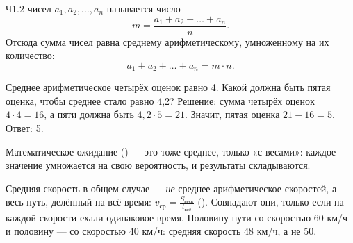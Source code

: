 
\begin{tema}{Ч1.2}
 чисел $a_1, a_2, \dots, a_n$ называется число
\[
  m=\frac{a_1+a_2+\dots+a_n}{n}.
\]
Отсюда сумма чисел равна среднему арифметическому, умноженному на их количество:
\[
  a_1+a_2+\dots+a_n=m\cdot n.
\]

\begin{primer}
Среднее арифметическое четырёх оценок равно 4. Какой должна быть пятая оценка,
чтобы среднее стало равно 4,2?
Решение: сумма четырёх оценок $4\cdot4=16$, а пяти должна быть $4{,}2\cdot5=21$.
Значит, пятая оценка $21-16=5$. Ответ: 5.
\end{primer}

 Математическое ожидание () — это тоже среднее,
только «с весами»: каждое значение умножается на свою вероятность,
и результаты складываются.

\begin{oshibka}
Средняя скорость в общем случае — \emph{не} среднее арифметическое скоростей,
а весь путь, делённый на всё время: $v_\text{ср}=\frac{S_\text{весь}}{t_\text{всё}}$ ().
Совпадают они, только если на каждой скорости ехали одинаковое время.
Половину пути со скоростью 60 км/ч и половину — со скоростью 40 км/ч:
средняя скорость 48 км/ч, а не 50.
\end{oshibka}
\end{tema}
